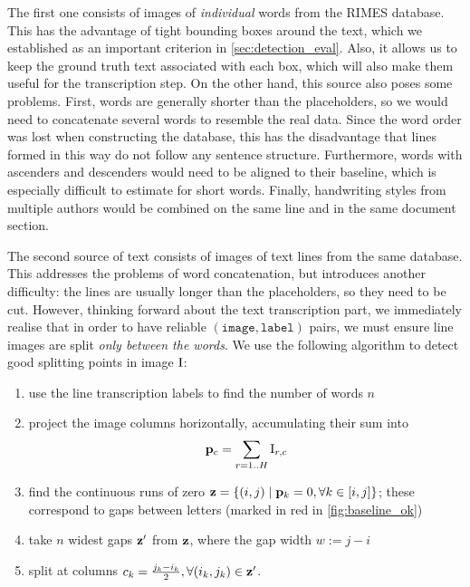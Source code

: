 			The first one consists of images of \emph{individual} words from the RIMES database. This has the advantage of tight bounding boxes around the text, which we established as an important criterion in \autoref{sec:detection_eval}. Also, it allows us to keep the ground truth text associated with each box, which will also make them useful for the transcription step. On the other hand, this source also poses some problems. First, words are generally shorter than the placeholders, so we would need to concatenate several words to resemble the real data. Since the word order was lost when constructing the database, this has the disadvantage that lines formed in this way do not follow any sentence structure. Furthermore, words with ascenders and descenders would need to be aligned to their baseline, which is especially difficult to estimate for short words. Finally, handwriting styles from multiple authors would be combined on the same line and in the same document section.

			The second source of text consists of images of text lines from the same database. This addresses the problems of word concatenation, but introduces another difficulty: the lines are usually longer than the placeholders, so they need to be cut. However, thinking forward about the text transcription part, we immediately realise that in order to have reliable \((\mathtt{image}, \mathtt{label})\) pairs, we must ensure line images are split \emph{only between the words}. We use the following algorithm to detect good splitting points in image \(\mathrm{I}\): %
			\noindent\begin{minipage}{\linewidth}
			\begin{enumerate}
				\item use the line transcription labels to find the number of words \(n\)
				\item project the image columns horizontally, accumulating their sum into \[
					\mathbf{p}_c = \sum_{r = 1..H }\mathrm{I}_{r,c}
				\]
				\item find the continuous runs of zero \(\mathbf{z} = \{ (i, j) \mid \mathbf{p}_k = 0, \forall k \in [i, j] \}\); these correspond to gaps between letters (marked in red in \autoref{fig:baseline_ok})
				\item take \(n\) widest gaps \(\mathbf{z}'\) from \(\mathbf{z}\), where the gap width \(w := j - i\)
				\item split at columns \(c_k = \frac{j_k - i_k}{2}, \forall (i_k, j_k) \in \mathbf{z}'\).
			\end{enumerate}
			\end{minipage}
			\\

